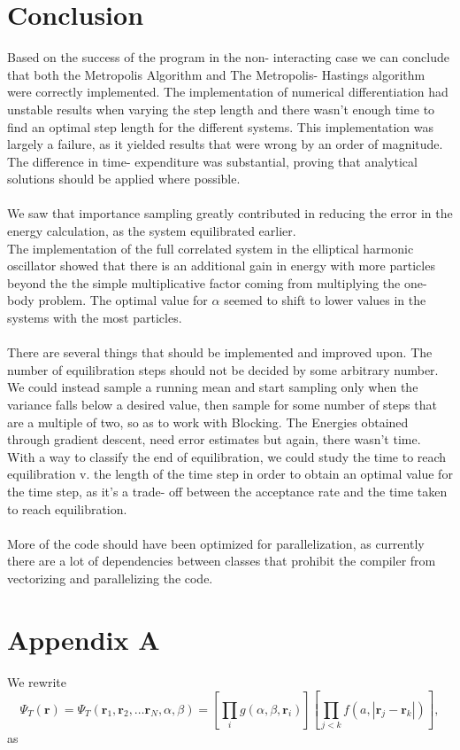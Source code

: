 \documentclass[11pt,a4paper,titlepage]{article}
\begin{document}
\section{Conclusion}
Based on the success of the program in the non- interacting case we can conclude that both the Metropolis Algorithm and The Metropolis- Hastings algorithm were correctly implemented. The implementation of numerical differentiation had unstable results when varying the step length and there wasn't enough time to find an optimal step length for the different systems. This implementation was largely a failure, as it yielded results that were wrong by an order of magnitude. The difference in time- expenditure was substantial, proving that analytical solutions should be applied where possible.\\\\We saw that importance sampling greatly contributed in reducing the error in the energy calculation, as the system equilibrated earlier.\\The implementation of the full correlated system in the elliptical harmonic oscillator showed that there is an additional gain in energy with more particles beyond the the simple multiplicative factor coming from multiplying the one- body problem. The optimal value for $\alpha$ seemed to shift to lower values in the systems with the most particles.\\\\There are several things that should be implemented and improved upon. The number of equilibration steps should not be decided by some arbitrary number. We could instead sample a running mean and start sampling only when the variance falls below a desired value, then sample for some number of steps that are a multiple of two, so as to work with Blocking. The Energies obtained through gradient descent, need error estimates but again, there wasn't time. \\ With a way to classify the end of equilibration, we could study the time to reach equilibration v. the length of the time step in order to obtain an optimal value for the time step, as it's a trade- off between the acceptance rate and the time taken to reach equilibration.\\\\More of the code should have been optimized for parallelization, as currently there are a lot of dependencies between classes that prohibit the compiler from vectorizing and parallelizing the code.

\section{Appendix A}\label{app_A}
We rewrite 
\begin{equation*}
\Psi_T(\mathbf{r})=\Psi_T(\mathbf{r}_1, \mathbf{r}_2, \dots \mathbf{r}_N,\alpha,\beta)
=\left[
    \prod_i g(\alpha,\beta,\mathbf{r}_i)
\right]
\left[
    \prod_{j<k}f(a,|\mathbf{r}_j-\mathbf{r}_k|)
\right],
\end{equation*}
as
\end{document}
